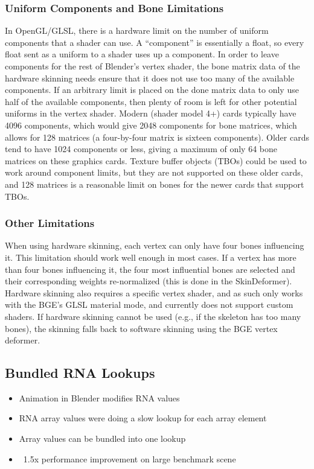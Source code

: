 
\subsubsection{Uniform Components and Bone Limitations}

In OpenGL/GLSL, there is a hardware limit on the number of uniform components that a shader can use.
A ``component'' is essentially a float, so every float sent as a uniform to a shader uses up a component.
In order to leave components for the rest of Blender's vertex shader, the bone matrix data of the hardware skinning needs ensure that it does not use too many of the available components.
If an arbitrary limit is placed on the done matrix data to only use half of the available components, then plenty of room is left for other potential uniforms in the vertex shader.
Modern (shader model 4+) cards typically have 4096 components, which would give 2048 components for bone matrices, which allows for 128 matrices (a four-by-four matrix is sixteen components).
Older cards tend to have 1024 components or less, giving a maximum of only 64 bone matrices on these graphics cards.
Texture buffer objects (TBOs) could be used to work around component limits\cite{ARB_texture_buffer_object}, but they are not supported on these older cards, and 128 matrices is a reasonable limit on bones for the newer cards that support TBOs.

\subsubsection{Other Limitations}

When using hardware skinning, each vertex can only have four bones influencing it.
This limitation should work well enough in most cases.
If a vertex has more than four bones influencing it, the four most influential bones are selected and their corresponding weights re-normalized (this is done in the SkinDeformer).
Hardware skinning also requires a specific vertex shader, and as such only works with the BGE's GLSL material mode, and currently does not support custom shaders.
If hardware skinning cannot be used (e.g., if the skeleton has too many bones), the skinning falls back to software skinning using the BGE vertex deformer.


\subsection{Bundled RNA Lookups}
\ifsummaries
\begin{itemize}
 \item Animation in Blender modifies RNA values
 \item RNA array values were doing a slow lookup for each array element
 \item Array values can be bundled into one lookup
 \item ~1.5x performance improvement on large benchmark scene
\end{itemize}
\fi

